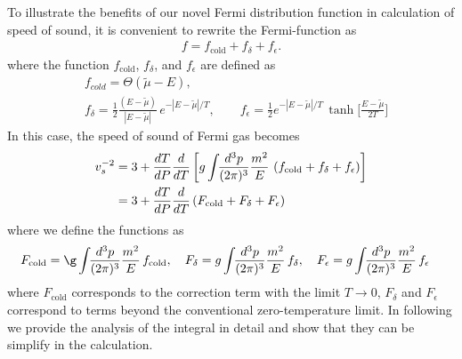 \documentclass[sn-mathphys,Numbered]{sn-jnl}
\theoremstyle{thmstyleone}%
\theoremstyle{thmstyletwo}%
\theoremstyle{thmstylethree}%
\begin{document}
To illustrate the benefits of our novel Fermi distribution
function in calculation of speed of sound, it is convenient to rewrite the Fermi-function as 
\begin{align}
f=f_{\mathrm{cold}} +f_\delta+f_\epsilon.
\end{align}
where the function $f_{\mathrm{cold}}$, $f_{\delta}$, and $f_{\epsilon}$ are defined as
\begin{align}
&f_{cold}=\Theta(\tilde\mu-E),\\
&f_{\delta}=\frac{1}{2}\frac{(E-\tilde\mu)}{|E-\tilde\mu|}\,e^{-|E-\tilde\mu|/T},\qquad f_{\epsilon}=\frac{1}{2}e^{-|E-\tilde\mu|/T}\,\tanh\bigg[\frac{E-\tilde\mu}{2T}\bigg]
\end{align}
In this case, the speed of sound of Fermi gas becomes
\begin{align}
v^{-2}_s&=3+\frac{dT}{dP}\frac{d}{dT}\left[g\int\!\!\frac{d^3p}{(2\pi)^3}\frac{m^2}{E}\,\left(f_\mathrm{cold} +f_\delta+f_\epsilon\right)\right]\notag\\
&=3+\frac{dT}{dP}\frac{d}{dT}\left(F_\mathrm{cold} +F_\delta+F_\epsilon\right)
\end{align}
where we define the functions as 
\begin{align}
&F_\mathrm{cold}=\g\int\!\!\frac{d^3p}{(2\pi)^3}\frac{m^2}{E}\,f_\mathrm{cold},\quad F_\delta=g\int\!\!\frac{d^3p}{(2\pi)^3}\frac{m^2}{E}\,f_\delta,\quad F_\epsilon=g\int\!\!\frac{d^3p}{(2\pi)^3}\frac{m^2}{E}\,f_\epsilon
\end{align}
where $F_{\mathrm{cold}}$ corresponds to the correction term with the limit $T\to 0$, $F_\delta$ and $F_\epsilon$ correspond to terms beyond the conventional
zero-temperature limit. In following we provide the analysis of the integral in detail and show that they can be simplify in the calculation.
\end{document}
